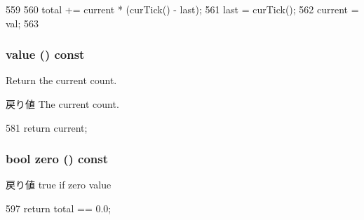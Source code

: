 \begin{DoxyCode}
559     {
560         total += current * (curTick() - last);
561         last = curTick();
562         current = val;
563     }
\end{DoxyCode}
\hypertarget{classStats_1_1AvgStor_aa9e486cb7eb0ad44f5f89923594b68a4}{
\subsubsection[{value}]{ value () const}}
\label{classStats_1_1AvgStor_aa9e486cb7eb0ad44f5f89923594b68a4}
Return the current count. \begin{DoxyReturn}{戻り値}
The current count. 
\end{DoxyReturn}



\begin{DoxyCode}
581 { return current; }
\end{DoxyCode}
\hypertarget{classStats_1_1AvgStor_a4e72b01b727d3165e75cba84eb507491}{
\subsubsection[{zero}]{\setlength{\rightskip}{0pt plus 5cm}bool zero () const}}
\label{classStats_1_1AvgStor_a4e72b01b727d3165e75cba84eb507491}
\begin{DoxyReturn}{戻り値}
true if zero value 
\end{DoxyReturn}



\begin{DoxyCode}
597 { return total == 0.0; }
\end{DoxyCode}


